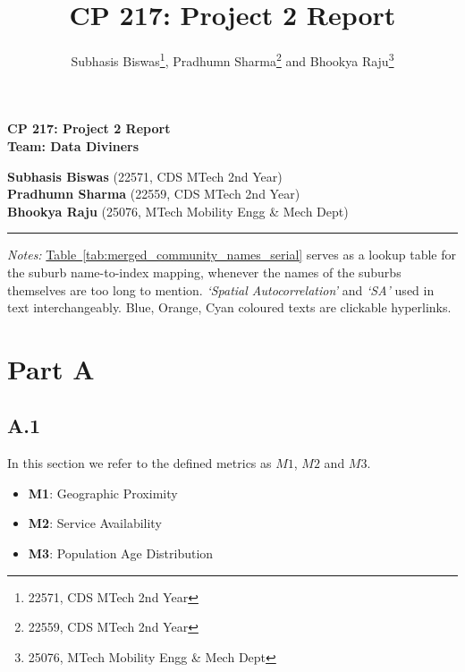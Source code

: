 \documentclass[
	a4paper, %
	10pt, %
	unnumberedsections, %
	twoside, %
]{LTJournalArticle}
\title{CP 217: Project 2 Report} %
\author{%
	Subhasis Biswas\thanks{22571, CDS MTech 2nd Year},  Pradhumn Sharma\thanks{22559, CDS MTech 2nd Year} and Bhookya Raju\thanks{25076, MTech Mobility Engg \& Mech Dept}
}
\begin{document}

\begin{center}
  \textbf{\Large CP 217: Project 2 Report} \\[1em]
  \textbf{Team: Data Diviners} \\[2em]
\end{center}
\vspace{-8pt}
\textbf{Subhasis Biswas} \> (22571, CDS MTech 2nd Year) \\
\textbf{Pradhumn Sharma} \> (22559, CDS MTech 2nd Year) \\
\textbf{Bhookya Raju} \> (25076, MTech Mobility Engg \& Mech Dept) \\

\vspace{-5pt}
\hrule\leavevmode


\vspace{-3pt}

{\fontsize{8}{6}\selectfont \textit{Notes:} \hyperref[tab:merged_community_names_serial]{Table~\ref{tab:merged_community_names_serial}} serves as a lookup table for the suburb name-to-index mapping, whenever the names of the suburbs themselves are too long to mention. \textit{`Spatial Autocorrelation'} and \textit{`SA'} used in text interchangeably. Blue, Orange, Cyan coloured texts are clickable hyperlinks.}

\section{Part A}



\subsection{A.1}

In this section we refer to the defined metrics as $M1$, $M2$ and $M3$.
\begin{itemize}
    \item \textbf{M1}: Geographic Proximity
    \item \textbf{M2}: Service Availability
    \item \textbf{M3}: Population Age Distribution
\end{itemize}
\end{document}
